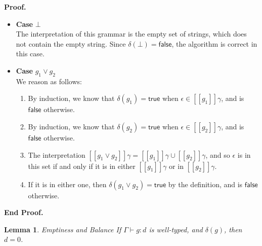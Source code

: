 \documentclass{article}
\newcommand{\judgebalance}[3][\Gamma]{{#1} \vdash {#2} : {#3}}
\newcommand{\true}{\mathsf{true}}
\newcommand{\false}{\mathsf{false}}
\newcommand{\interp}[1]{[\![{#1}]\!]}
\newcommand{\emptify}[1]{\delta({#1})}
\newtheorem{lemma}{Lemma}
\newenvironment{proof}{\noindent\textbf{Proof.}}
{\noindent\textbf{End Proof.}}
\newenvironment{caseblock}{\begin{itemize}}{\end{itemize}}
\newenvironment{case}[1]{\item \textbf{Case} {#1}\\}{}
\begin{document}
\begin{proof}
\begin{caseblock}
  \begin{case}{$\bot$}
    The interpretation of this grammar is the empty set of strings, which does not
    contain the empty string. Since $\emptify{\bot} = \false$, the algorithm is correct in
    this case. 
  \end{case}

  \begin{case}{$g_1 \vee g_2$}
    We reason as follows:
    \begin{enumerate}
      \item By induction, we know that $\emptify{g_1} = \true$ when $\epsilon \in \interp{g_1}\gamma$, 
        and is $\false$  otherwise. 
      \item By induction, we know that $\emptify{g_2} = \true$ when $\epsilon \in \interp{g_2}\gamma$, 
        and is $\false$  otherwise. 
      \item The interpretation $\interp{g_1 \vee g_2}\gamma = \interp{g_1}\gamma \cup \interp{g_2}\gamma$,  
        and so $\epsilon$ is in this set if and only if it is in either $\interp{g_1}\gamma$ or in 
        $\interp{g_2}\gamma$.
      \item If it is in either one, then $\emptify{g_1 \vee g_2} = \true$ by the definition, and is 
        $\false$ otherwise. 
    \end{enumerate}
  \end{case}
\end{caseblock}
\end{proof}

\begin{lemma}{Emptiness and Balance}
If $\judgebalance{g}{d}$ is well-typed, and $\emptify{g}$, then $d = 0$. 
\end{lemma}
\end{document}
